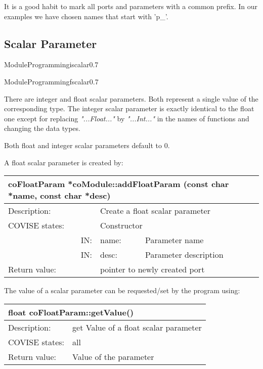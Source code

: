 It is a good habit to mark all ports and parameters with a common prefix. In our examples 
we have chosen names that start with 'p\_'.

\subsection{Scalar Parameter}


\begin{covimgpath}{ModuleProgramming}{iscalar}{0.7} \end{covimgpath}

\begin{covimgpath}{ModuleProgramming}{fscalar}{0.7} \end{covimgpath}

There are integer and float scalar parameters. Both represent a single value of the 
corresponding type. The integer scalar parameter is exactly identical to the float one 
except for replacing {\it "...Float..."} by {\it "...Int..."} in the names of functions 
and changing the data types.

Both float and integer scalar parameters default to 0. 

A float scalar parameter is created by:

			  
\begin{longtable}{|p{4cm}|p{2.5cm}|p{7cm}|}
\hline
\multicolumn{3}{|p{13.5cm}|}{\bf coFloatParam *coModule::addFloatParam \newline
                                  (const char *name, const char *desc)} \\
\hline
{Description:}   
                        & \multicolumn{2}{|p{9.5cm}|}{Create a float scalar parameter} \\
\hline
{COVISE states:} & \multicolumn{2}{|p{9.5cm}|}{Constructor} \\
\hline
\multicolumn{1}{|r|}{IN:} & {name:} 
                             & {Parameter name}\\
\hline
\multicolumn{1}{|r|}{IN:} & {desc:} 
                            & {Parameter description}\\
\hline
{Return value:}  
                        & \multicolumn{2}{|p{9.5cm}|}{pointer to newly created port} \endhead
\hline
\end{longtable}

The value of a scalar parameter can be requested/set by the program using:


\begin{longtable}{|p{4cm}|p{10cm}|}
\hline
\multicolumn{2}{|p{13.5cm}|}{\bf float coFloatParam::getValue()} \\
\hline
{Description:}   
                        & {get Value of a float scalar parameter } \\
\hline
{COVISE states:} & {all} \\
\hline
{Return value:}  
                        & {Value of the parameter } \endhead
\hline
\end{longtable}


